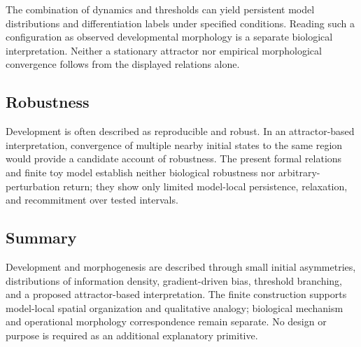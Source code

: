 The combination of dynamics and thresholds can yield persistent model distributions and differentiation labels under specified conditions. Reading such a configuration as observed developmental morphology is a separate biological interpretation. Neither a stationary attractor nor empirical morphological convergence follows from the displayed relations alone.

\subsection{Robustness}

Development is often described as reproducible and robust. In an attractor-based interpretation, convergence of multiple nearby initial states to the same region would provide a candidate account of robustness. The present formal relations and finite toy model establish neither biological robustness nor arbitrary-perturbation return; they show only limited model-local persistence, relaxation, and recommitment over tested intervals.

\subsection{Summary}

Development and morphogenesis are described through small initial asymmetries, distributions of information density, gradient-driven bias, threshold branching, and a proposed attractor-based interpretation. The finite construction supports model-local spatial organization and qualitative analogy; biological mechanism and operational morphology correspondence remain separate. No design or purpose is required as an additional explanatory primitive.
